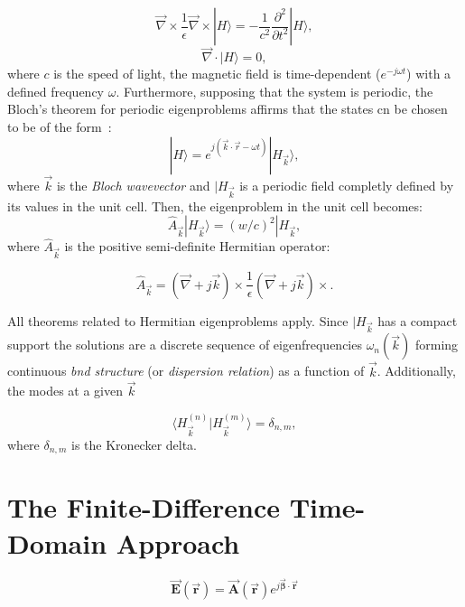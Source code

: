 \documentclass[journal,transmag]{IEEEtran}
\begin{document}
\begin{equation}
	\vec{\nabla} \times \frac{1}{\epsilon}\vec{\nabla}\times | H \rangle = 
	-\frac{1}{c^{2}}\frac{\partial^{2}}{\partial t^{2}} |H \rangle,
\end{equation}
\begin{equation}
	\vec{\nabla}\cdot |H \rangle = 0,
\end{equation}
where $c$ is the speed of light, the magnetic field is time-dependent ($e^{-j\omega t}$)
with a defined frequency $\omega$.
Furthermore, supposing that the system is periodic, the Bloch's theorem
for periodic eigenproblems affirms that the states cn be chosen to be of the form~\cite{ashcroft_solid_1976}:
\begin{equation}
	|H \rangle = e^{j(\vec{k} \cdot \vec{r}-\omega t)} |H_{\vec{k}} \rangle,
\end{equation}
where $\vec{k}$ is the \textit{Bloch wavevector} and $|H_{\vec{k}}$ is a periodic field
completly defined by its values in the unit cell. Then, the eigenproblem in the unit cell becomes:
\begin{equation}
    \hat{A}_{\vec{k}}|H_{\vec{k}} \rangle = {(w/c)}^{2}|H_{\vec{k}},
\end{equation}
where $\hat{A}_{\vec{k}}$ is the positive semi-definite Hermitian operator:

\begin{equation}
	\hat{A}_{\vec{k}} = (\vec{\nabla}+j\vec{k})\times \frac{1}{\epsilon}
	(\vec{\nabla}+j\vec{k})\times.
\end{equation}

All theorems related to Hermitian eigenproblems apply. Since $|H_{\vec{k}}$
has a compact support the solutions are a discrete sequence of eigenfrequencies 
$\omega_{n}(\vec{k})$ forming  continuous \textit{bnd structure} (or \textit{dispersion relation})
as a function of $\vec{k}$. Additionally, the modes at a given $\vec{k}$

\begin{equation}
	\langle H_{\vec{k}}^{(n)}|H_{\vec{k}}^{(m)} \rangle = \delta_{n,m},
\end{equation}
where $\delta_{n,m}$ is the Kronecker delta.
\section{The Finite-Difference Time-Domain Approach}

\begin{equation}
	\vec{\bm{E}}(\vec{\bm{r}}) = \vec{\bm{A}}(\vec{\bm{r}}) e^{j \vec{\bm{\beta}}\cdot \vec{\bm{r}}}
\end{equation}
\end{document}
